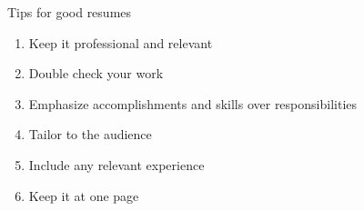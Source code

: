 \documentclass[aspectratio=169]{beamer}
\begin{document}
\begin{frame}{Tips for good resumes}
    \begin{enumerate}[<+->]
        \item Keep it professional and relevant
        \item Double check your work
        \item Emphasize accomplishments and skills over responsibilities
        \item Tailor to the audience
        \item Include any relevant experience
        \item Keep it at one page
    \end{enumerate}
\end{frame}
\end{document}

